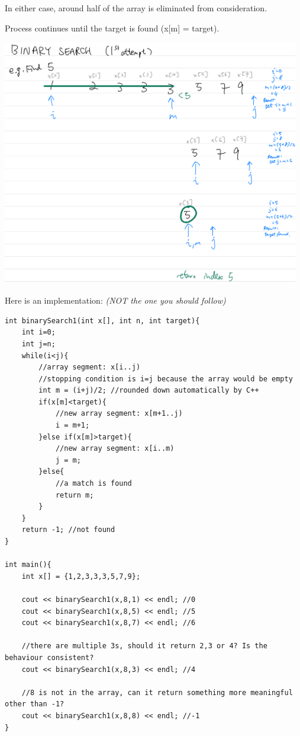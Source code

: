 In either case, around half of the array is eliminated from consideration.

Process continues until the target is found (x[m] = target).
\vspace{6mm}

\includegraphics[width=13cm]{images/ch7-binarysearch1.png}
\pagebreak

Here is an implementation: \textit{(NOT the one you should follow)}

\begin{lstlisting}
int binarySearch1(int x[], int n, int target){
    int i=0;
    int j=n;
    while(i<j){
        //array segment: x[i..j)
        //stopping condition is i=j because the array would be empty
        int m = (i+j)/2; //rounded down automatically by C++
        if(x[m]<target){
            //new array segment: x[m+1..j)
            i = m+1;
        }else if(x[m]>target){
            //new array segment: x[i..m)
            j = m;
        }else{
            //a match is found
            return m;
        }
    }
    return -1; //not found
}

int main(){
    int x[] = {1,2,3,3,3,5,7,9};
 
    cout << binarySearch1(x,8,1) << endl; //0
    cout << binarySearch1(x,8,5) << endl; //5
    cout << binarySearch1(x,8,7) << endl; //6

    //there are multiple 3s, should it return 2,3 or 4? Is the behaviour consistent?
    cout << binarySearch1(x,8,3) << endl; //4

    //8 is not in the array, can it return something more meaningful other than -1?
    cout << binarySearch1(x,8,8) << endl; //-1
}
\end{lstlisting}

